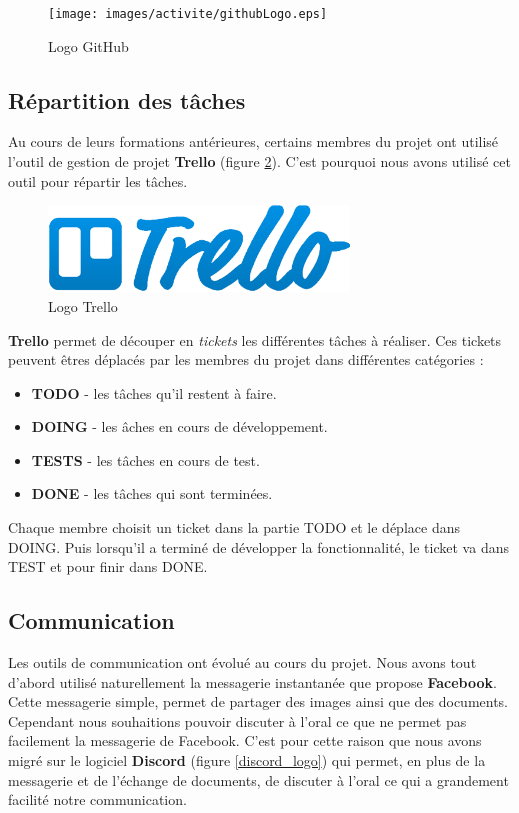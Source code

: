 \begin{figure}[H]
\centering
\texttt{[image: images/activite/githubLogo.eps]}
\caption{Logo GitHub}
\label{github_logo}
\end{figure}



\subsection{Répartition des tâches}
Au cours de leurs formations antérieures, certains membres du projet ont utilisé l'outil de gestion de projet \textbf{Trello} (figure \ref{trello_logo}). 
C'est pourquoi nous avons utilisé cet outil pour répartir les tâches.\\

\begin{figure}[H]
\centering
\includegraphics[width=8cm]{images/activite/trelloLogo.eps}
\caption{Logo Trello}
\label{trello_logo}
\end{figure}

\textbf{Trello} permet de découper en \textit{tickets} les différentes t\^aches à réaliser. Ces tickets peuvent \^etres déplacés par les membres du projet dans différentes catégories :

\begin{itemize}
\item \textbf{TODO} - les t\^aches qu'il restent à faire. 
\item \textbf{DOING} - les \^aches en cours de développement.
\item \textbf{TESTS} - les t\^aches en cours de test.
\item \textbf{DONE} - les t\^aches qui sont terminées.\\
\end{itemize}

Chaque membre choisit un ticket dans la partie TODO et le déplace dans DOING. 
Puis lorsqu'il a terminé de développer la fonctionnalité, le ticket va dans TEST et pour finir dans DONE.

\subsection{Communication}
Les outils de communication ont évolué au cours du projet. Nous avons tout d'abord utilisé naturellement la messagerie instantanée que propose \textbf{Facebook}. 
Cette messagerie simple, permet de partager des images ainsi que des documents.
Cependant nous souhaitions pouvoir discuter à l'oral ce que ne permet pas facilement la messagerie de Facebook. 
C'est pour cette raison que nous avons migré sur le logiciel \textbf{Discord} (figure \ref{discord_logo}) qui permet, en plus de la messagerie et de l'échange de documents, de discuter à l'oral ce qui a grandement facilité notre communication.

